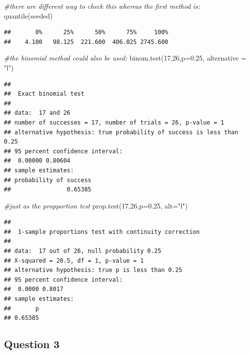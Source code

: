 \documentclass[
]{article}
\newenvironment{Shaded}{\begin{snugshade}}{\end{snugshade}}
\newcommand{\AttributeTok}[1]{\textcolor[rgb]{0.77,0.63,0.00}{#1}}
\newcommand{\CommentTok}[1]{\textcolor[rgb]{0.56,0.35,0.01}{\textit{#1}}}
\newcommand{\DecValTok}[1]{\textcolor[rgb]{0.00,0.00,0.81}{#1}}
\newcommand{\FloatTok}[1]{\textcolor[rgb]{0.00,0.00,0.81}{#1}}
\newcommand{\FunctionTok}[1]{\textcolor[rgb]{0.00,0.00,0.00}{#1}}
\newcommand{\NormalTok}[1]{#1}
\newcommand{\StringTok}[1]{\textcolor[rgb]{0.31,0.60,0.02}{#1}}
\begin{document}
\begin{Shaded}
\begin{Highlighting}[]
\CommentTok{\#there are different way to check this whereas the first method is:}
\FunctionTok{quantile}\NormalTok{(seeded)}
\end{Highlighting}
\end{Shaded}

\begin{verbatim}
##       0%      25%      50%      75%     100% 
##    4.100   98.125  221.600  406.025 2745.600
\end{verbatim}

\begin{Shaded}
\begin{Highlighting}[]
\CommentTok{\#the binomial method could also be used: }
\FunctionTok{binom.test}\NormalTok{(}\DecValTok{17}\NormalTok{,}\DecValTok{26}\NormalTok{,}\AttributeTok{p=}\FloatTok{0.25}\NormalTok{, }\AttributeTok{alternative =} \StringTok{"l"}\NormalTok{)}
\end{Highlighting}
\end{Shaded}

\begin{verbatim}
## 
##  Exact binomial test
## 
## data:  17 and 26
## number of successes = 17, number of trials = 26, p-value = 1
## alternative hypothesis: true probability of success is less than 0.25
## 95 percent confidence interval:
##  0.00000 0.80604
## sample estimates:
## probability of success 
##                0.65385
\end{verbatim}

\begin{Shaded}
\begin{Highlighting}[]
\CommentTok{\#just as the propportion test}
\FunctionTok{prop.test}\NormalTok{(}\DecValTok{17}\NormalTok{,}\DecValTok{26}\NormalTok{,}\AttributeTok{p=}\FloatTok{0.25}\NormalTok{, }\AttributeTok{alt=}\StringTok{"l"}\NormalTok{)}
\end{Highlighting}
\end{Shaded}

\begin{verbatim}
## 
##  1-sample proportions test with continuity correction
## 
## data:  17 out of 26, null probability 0.25
## X-squared = 20.5, df = 1, p-value = 1
## alternative hypothesis: true p is less than 0.25
## 95 percent confidence interval:
##  0.0000 0.8017
## sample estimates:
##       p 
## 0.65385
\end{verbatim}

\hypertarget{question-3}{%
\subsection{Question 3}\label{question-3}}
\end{document}
